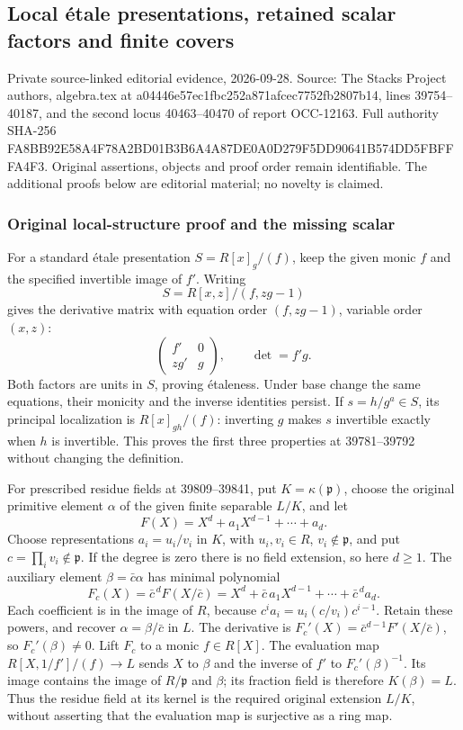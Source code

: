 \subsection{Local étale presentations, retained scalar factors and finite covers}\label{local-uxe9tale-presentations-retained-scalar-factors-and-finite-covers}

Private source-linked editorial evidence, 2026-09-28. Source: The Stacks Project authors, algebra.tex at a04446e57ec1fbc252a871afcec7752fb2807b14, lines 39754--40187, and the second locus 40463--40470 of report OCC-12163. Full authority SHA-256 FA8BB92E58A4F78A2BD01B3B6A4A87DE0A0D279F5DD90641B574DD5FBFFFA4F3. Original assertions, objects and proof order remain identifiable. The additional proofs below are editorial material; no novelty is claimed.

\subsubsection{Original local-structure proof and the missing scalar}\label{original-local-structure-proof-and-the-missing-scalar}

For a standard étale presentation \(S=R[x]_g/(f)\), keep the given monic \(f\) and the specified invertible image of \(f'\). Writing \[
S=R[x,z]/(f,zg-1)
\] gives the derivative matrix with equation order \((f,zg-1)\), variable order \((x,z)\): \[
\begin{pmatrix} f'&0\\zg'&g\end{pmatrix},
\qquad \det=f'g.
\] Both factors are units in \(S\), proving étaleness. Under base change the same equations, their monicity and the inverse identities persist. If \(s=h/g^a\in S\), its principal localization is \(R[x]_{gh}/(f)\): inverting \(g\) makes \(s\) invertible exactly when \(h\) is invertible. This proves the first three properties at 39781--39792 without changing the definition.

For prescribed residue fields at 39809--39841, put \(K=\kappa(\mathfrak p)\), choose the original primitive element \(\alpha\) of the given finite separable \(L/K\), and let \[
F(X)=X^d+a_1X^{d-1}+\cdots+a_d.
\] Choose representations \(a_i=u_i/v_i\) in \(K\), with \(u_i,v_i\in R\), \(v_i\notin\mathfrak p\), and put \(c=\prod_i v_i\notin\mathfrak p\). If the degree is zero there is no field extension, so here \(d\ge1\). The auxiliary element \(\beta=\bar c\alpha\) has minimal polynomial \[
F_c(X)=\bar c^{\,d}F(X/\bar c)
=X^d+\bar c\,a_1X^{d-1}+\cdots+\bar c^{\,d}a_d.
\] Each coefficient is in the image of \(R\), because \(c^i a_i=u_i(c/v_i)c^{i-1}\). Retain these powers, and recover \(\alpha=\beta/\bar c\) in \(L\). The derivative is \(F_c'(X)=\bar c^{d-1}F'(X/\bar c)\), so \(F_c'(\beta)\ne0\). Lift \(F_c\) to a monic \(f\in R[X]\). The evaluation map \(R[X,1/f']/(f)\to L\) sends \(X\) to \(\beta\) and the inverse of \(f'\) to \(F_c'(\beta)^{-1}\). Its image contains the image of \(R/\mathfrak p\) and \(\beta\); its fraction field is therefore \(K(\beta)=L\). Thus the residue field at its kernel is the required original extension \(L/K\), without asserting that the evaluation map is surjective as a ring map.

